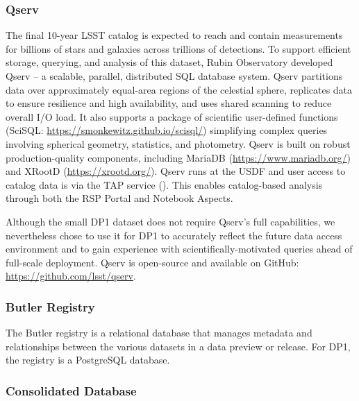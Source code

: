 \subsubsection{Qserv
\label{sssec:qserv}}
The final 10-year \gls{LSST} catalog is expected to reach \tenyearcatalogsize and contain measurements for billions of stars and galaxies across trillions of detections.
To support efficient storage, querying, and analysis of this dataset,  Rubin Observatory developed Qserv \citep{Wang:2011:QDS:2063348.2063364, C15_adassxxxii} -- a scalable, parallel, distributed SQL database system.
\gls{Qserv} partitions data over approximately equal-area regions of the celestial sphere, replicates data to ensure resilience and high availability, and uses shared scanning to reduce overall I/O load.
It also supports a package of scientific user-defined functions (SciSQL: \url{https://smonkewitz.github.io/scisql/}) simplifying complex queries involving spherical geometry, statistics, and photometry.
\gls{Qserv} is built on robust production-quality components, including MariaDB (\url{https://www.mariadb.org/}) and XRootD (\url{https://xrootd.org/}).
Qserv runs at the \gls{USDF} and user access to catalog data is via the TAP service ().
This enables catalog-based analysis through both the \gls{RSP} Portal and Notebook Aspects.

Although the small \gls{DP1} dataset does not require Qserv’s full capabilities, we nevertheless chose to use it for \gls{DP1} to accurately reflect the future data access environment and to gain experience with scientifically-motivated queries ahead of full-scale deployment.
\gls{Qserv} is open-source and available on GitHub: \url{https://github.com/lsst/qserv}.

\subsubsection{Butler Registry
\label{sssec:butler_registry}}
The \gls{Butler} registry is a relational database that manages metadata and relationships between the various datasets in a data preview or release.
For \gls{DP1}, the registry is a PostgreSQL database.

\subsubsection{Consolidated Database
\label{sssec:consdb}}

